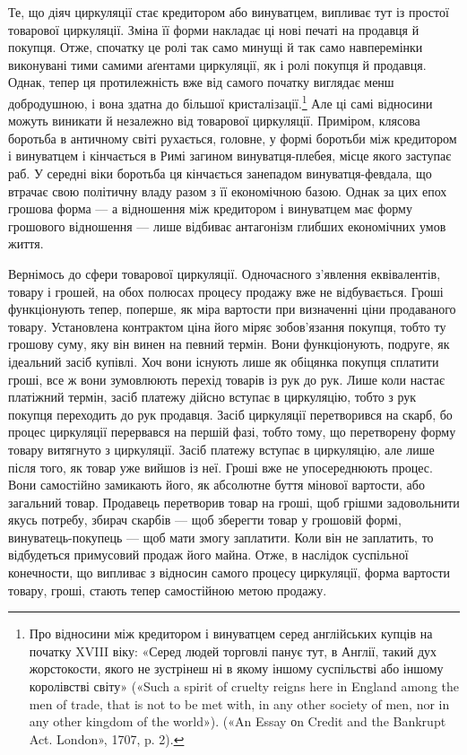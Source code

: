 Те, що діяч циркуляції стає кредитором або винуватцем, випливає
тут із простої товарової циркуляції. Зміна її форми накладає ці
нові печаті на продавця й покупця. Отже, спочатку це ролі так
само минущі й так само навперемінки виконувані тими самими аґентами
циркуляції, як і ролі покупця й продавця. Однак, тепер ця
протилежність вже від самого початку виглядає менш добродушною,
і вона здатна до більшої кристалізації.\footnote{
Про відносини між кредитором і винуватцем серед англійських
купців на початку XVIII віку: «Серед людей торговлі панує тут, в Англії,
такий дух жорстокости, якого не зустрінеш ні в якому іншому суспільстві
або іншому королівстві світу» («Such a spirit of cruelty reigns here
in England among the men of trade, that is not to be met with, in any other
society of men, nor in any other kingdom of the world»). («An Essay оn Credit and the Bankrupt Act.
London», 1707, p. 2).
} Але ці самі відносини
можуть виникати й незалежно від товарової циркуляції.
Приміром, клясова боротьба в античному світі рухається, головне,
у формі боротьби між кредитором і винуватцем і кінчається в
Римі загином винуватця-плебея, місце якого заступає раб. У середні
віки боротьба ця кінчається занепадом винуватця-февдала,
що втрачає свою політичну владу разом з її економічною
базою. Однак за цих епох грошова форма — а відношення між
кредитором і винуватцем має форму грошового відношення — лише
відбиває антагонізм глибших економічних умов життя.

Вернімось до сфери товарової циркуляції. Одночасного з’явлення
еквівалентів, товару і грошей, на обох полюсах процесу
продажу вже не відбувається. Гроші функціонують тепер, поперше,
як міра вартости при визначенні ціни продаваного товару.
Установлена контрактом ціна його міряє зобов’язання покупця,
тобто ту грошову суму, яку він винен на певний термін. Вони
функціонують, подруге, як ідеальний засіб купівлі. Хоч вони
існують лише як обіцянка покупця сплатити гроші, все ж вони
зумовлюють перехід товарів із рук до рук. Лише коли настає
платіжний термін, засіб платежу дійсно вступає в циркуляцію,
тобто з рук покупця переходить до рук продавця. Засіб циркуляції
перетворився на скарб, бо процес циркуляції перервався
на першій фазі, тобто тому, що перетворену форму товару витягнуто
з циркуляції. Засіб платежу вступає в циркуляцію, але
лише після того, як товар уже вийшов із неї. Гроші вже не упосереднюють
процес. Вони самостійно замикають його, як абсолютне
буття мінової вартости, або загальний товар. Продавець
перетворив товар на гроші, щоб грішми задовольнити якусь
потребу, збирач скарбів — щоб зберегти товар у грошовій
формі, винуватець-покупець — щоб мати змогу заплатити. Коли
він не заплатить, то відбудеться примусовий продаж його майна.
Отже, в наслідок суспільної конечности, що випливає з відносин
самого процесу циркуляції, форма вартости товару, гроші, стають
тепер самостійною метою продажу.

